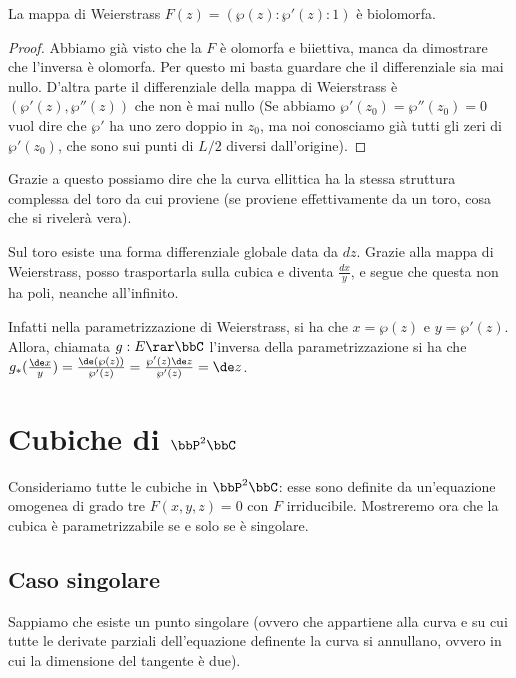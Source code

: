   \begin{proposizione}
      La mappa di Weierstrass $F(z)=(\wp(z) : \wp'(z) : 1)$ è biolomorfa.
  \end{proposizione}
  \begin{proof}
      Abbiamo già visto che la $F$ è olomorfa e biiettiva, manca da dimostrare che l'inversa è olomorfa.
      Per questo mi basta guardare che il differenziale sia mai nullo. D'altra parte il differenziale della mappa di Weierstrass è $ (\wp'(z), \wp''(z))$ che non è mai nullo (Se abbiamo $\wp'(z_0) = \wp''(z_0) = 0$ vuol dire che $\wp'$ ha uno zero doppio in $z_0$, ma noi conosciamo già tutti gli zeri di $\wp'(z_0)$, che sono sui punti di $L/2$ diversi dall'origine).
  \end{proof}

  Grazie a questo possiamo dire che la curva ellittica ha la stessa struttura complessa del toro da cui proviene (se proviene effettivamente da un toro, cosa che si rivelerà vera).

  \begin{osservazione}
      Sul toro esiste una forma differenziale globale data da $dz$. Grazie alla mappa di Weierstrass, posso trasportarla sulla cubica e diventa $\frac{dx}y$, e segue che questa non ha poli, neanche all'infinito.

      Infatti nella parametrizzazione di Weierstrass, si ha che $x = \wp(z)$ e $y = \wp'(z)$. Allora, chiamata $g: E \rar \bbC$ l'inversa della parametrizzazione si ha che $g_*(\frac{\de x}{y}) = \frac{\de(\wp(z))}{\wp'(z)} = \frac{\wp'(z) \de z}{\wp'(z)} = \de z$.

  \end{osservazione}

\section{Cubiche di $\bbP^2\bbC$}
Consideriamo tutte le cubiche in $\bbP^2\bbC$: esse sono definite da
un'equazione omogenea di grado tre $F(x, y, z) = 0$ con $F$
irriducibile. Mostreremo ora che la cubica è parametrizzabile se e solo
se è singolare.


\subsection{Caso singolare}
Sappiamo che esiste un punto singolare (ovvero che appartiene alla curva
e su cui tutte le derivate parziali dell'equazione definente la curva si
annullano, ovvero in cui la dimensione del tangente è due).

